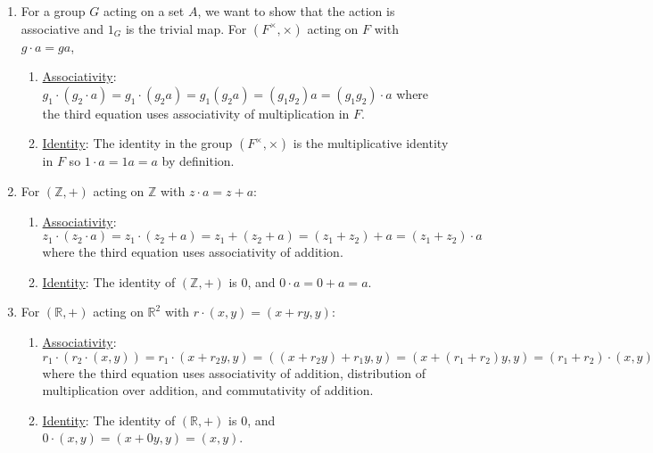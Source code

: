 \documentclass[]{article}
\newcommand{\bbz}{\mathbb{Z}}
\newcommand{\bbr}{\mathbb{R}}
\begin{document}
\begin{enumerate}

\item For a group $G$ acting on a set $A$, we want to show that the action is associative and $1_G$ is the trivial map. For $(F^\times,\times)$ acting on $F$ with $g\cdot a = ga$, 
\begin{enumerate}
\item \underline{Associativity}: $g_1\cdot (g_2\cdot a) = g_1\cdot (g_2a) = g_1(g_2a) = (g_1g_2)a = (g_1g_2)\cdot a$ where the third equation uses associativity of multiplication in $F$.
\item \underline{Identity}: The identity in the group	 $(F^\times,\times)$ is the multiplicative identity in $F$ so $1\cdot a = 1a = a$ by definition.
\end{enumerate}


\item For $(\bbz,+)$ acting on $\bbz$ with $z\cdot a = z+a$:
\begin{enumerate} 
\item \underline{Associativity}: $z_1\cdot (z_2\cdot a) = z_1\cdot (z_2+a) = z_1+(z_2+a) = (z_1+z_2)+a = (z_1+z_2)\cdot a$ where the third equation uses associativity of addition.
\item \underline{Identity}: The identity of $(\bbz, +)$ is $0$, and $0\cdot a = 0+a = a$.
\end{enumerate}


\item For $(\bbr,+)$ acting on $\bbr^2$ with $r\cdot(x,y) = (x+ry,y)$:
\begin{enumerate} 
\item \underline{Associativity}: $r_1\cdot (r_2\cdot (x,y)) = r_1\cdot (x+r_2y,y) = ((x+r_2y)+r_1y,y) = (x+(r_1+r_2)y,y) = (r_1+r_2)\cdot (x,y)$ where the third equation uses associativity of addition, distribution of multiplication over addition, and commutativity of addition.
\item \underline{Identity}: The identity of $(\bbr, +)$ is $0$, and $0\cdot (x,y) = (x+0y,y) = (x,y)$.
\end{enumerate}



\end{enumerate}
\end{document}
